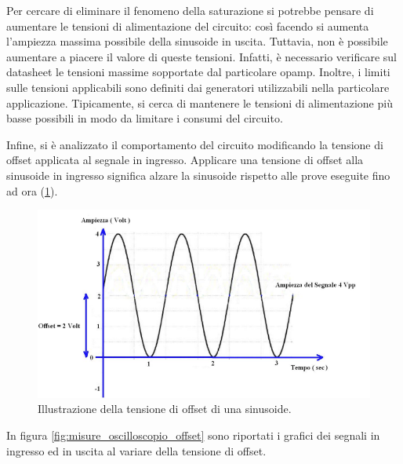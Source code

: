 \noindent
Per cercare di eliminare il fenomeno della saturazione si potrebbe pensare di aumentare le tensioni di alimentazione del circuito: così facendo si aumenta l'ampiezza massima possibile della sinusoide in uscita. Tuttavia, non è possibile aumentare a piacere il valore di queste tensioni. Infatti, è necessario verificare sul datasheet le tensioni massime sopportate dal particolare opamp. Inoltre, i limiti sulle tensioni applicabili sono definiti dai generatori utilizzabili nella particolare applicazione. Tipicamente, si cerca di mantenere le tensioni di alimentazione più basse possibili in modo da limitare i consumi del circuito.


Infine, si è analizzato il comportamento del circuito modificando la tensione di offset applicata al segnale in ingresso. Applicare una tensione di offset alla sinusoide in ingresso significa alzare la sinusoide rispetto alle prove eseguite fino ad ora (\Fig\ref{fig:misure_oscilloscopio_offset_sinusoide}).
\begin{figure}[h!]
	\centering
	\includegraphics[width=0.6\linewidth]{./ImageFiles/Laboratorio 1/tensione offset}
	\caption{Illustrazione della tensione di offset di una sinusoide.}
	\label{fig:misure_oscilloscopio_offset_sinusoide}
\end{figure} 

\noindent
In figura \ref{fig:misure_oscilloscopio_offset} sono riportati i grafici dei segnali in ingresso ed in uscita al variare della tensione di offset.


